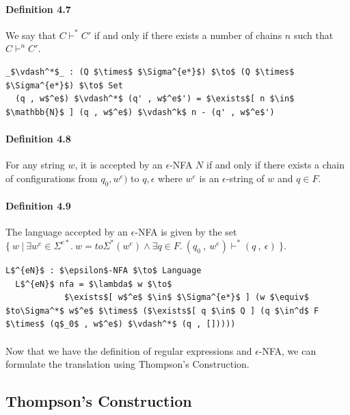 \documentclass[twoside,openright,final]{bhamthesis}
\begin{document}
\paragraph{Definition 4.7} We say that \(C \vdash^* C'\) if and only
if there exists a number of chains \(n\) such that \(C \vdash^n C'\). 

\begin{lstlisting}[mathescape=true]
  _$\vdash^*$_ : (Q $\times$ $\Sigma^{e*}$) $\to$ (Q $\times$ $\Sigma^{e*}$) $\to$ Set
  (q , w$^e$) $\vdash^*$ (q' , w$^e$') = $\exists$[ n $\in$ $\mathbb{N}$ ] (q , w$^e$) $\vdash^k$ n - (q' , w$^e$')
\end{lstlisting}

\paragraph{Definition 4.8} For any string \(w\), it is accepted by an \(\epsilon\)-NFA \(N\)
if and only if there exists a chain of configurations from \(q_0 ,
w^e)\) to \(q , \epsilon\) where \(w^e\) is an \(\epsilon\)-string of \(w\) and \(q \in
F\). 

\paragraph{Definition 4.9} The language accepted by an
\(\epsilon\)-NFA is given by the set \(\{\ w\ |\ \exists w^e\in
\Sigma^{e*}.\ w = to\Sigma^*(w^e) \wedge \exists q\in F.\ (q_0\ ,\
w^e) \vdash^* (q\ ,\ \epsilon)\ \}\). 

\begin{lstlisting}[mathescape=true]
  L$^{eN}$ : $\epsilon$-NFA $\to$ Language
  L$^{eN}$ nfa = $\lambda$ w $\to$ 
            $\exists$[ w$^e$ $\in$ $\Sigma^{e*}$ ] (w $\equiv$ $to\Sigma^*$ w$^e$ $\times$ ($\exists$[ q $\in$ Q ] (q $\in^d$ F $\times$ (q$_0$ , w$^e$) $\vdash^*$ (q , []))))
\end{lstlisting} 
\paragraph{} Now that we have the definition of regular expressions and
\(\epsilon\)-NFA, we can formulate the translation using Thompson's Construction.

\subsection{Thompson's Construction}
\end{document}
